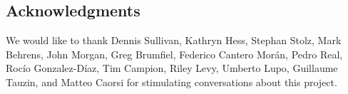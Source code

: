 
\subsection*{Acknowledgments} We would like to thank Dennis Sullivan, Kathryn Hess, Stephan Stolz, Mark Behrens, John Morgan, Greg Brumfiel, Federico Cantero Mor\'an, Pedro Real, Roc\'io Gonzalez-D\'iaz, Tim Campion, Riley Levy, Umberto Lupo, Guillaume Tauzin, and Matteo Caorsi for stimulating conversations about this project.
